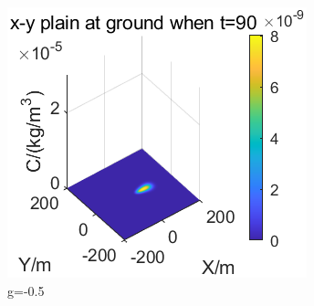 \documentclass{article}
\begin{document}
\begin{figure}[htbp]
		\begin{minipage}{0.33\textwidth}
			\includegraphics[width=\textwidth]{pics/g=-0.5,t=90.png}
		\end{minipage}
		\caption{g=-0.5}
		\label{fig22}
	\end{figure}
\end{document}
